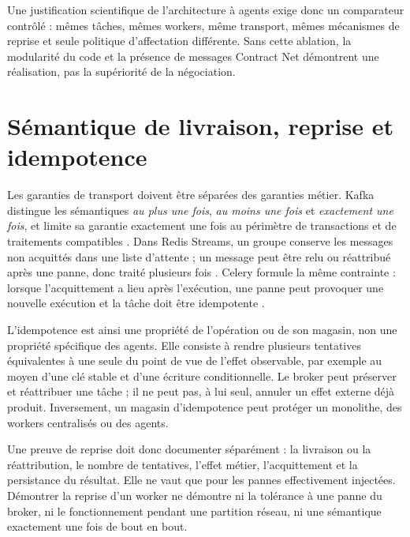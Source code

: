 Une justification scientifique de l'architecture à agents exige donc un comparateur
contrôlé : mêmes tâches, mêmes workers, même transport, mêmes mécanismes de reprise et
seule politique d'affectation différente. Sans cette ablation, la modularité du code et
la présence de messages Contract Net démontrent une réalisation, pas la supériorité de la
négociation.

\section{Sémantique de livraison, reprise et idempotence}

Les garanties de transport doivent être séparées des garanties métier. Kafka distingue
les sémantiques \textit{au plus une fois}, \textit{au moins une fois} et
\textit{exactement une fois}, et limite sa garantie exactement une fois au périmètre de
transactions et de traitements compatibles \cite{kafka2026semantics}. Dans Redis
Streams, un groupe conserve les messages non acquittés dans une liste d'attente ; un
message peut être relu ou réattribué après une panne, donc traité plusieurs fois
\cite{redis2026streams}. Celery formule la même contrainte : lorsque l'acquittement a lieu
après l'exécution, une panne peut provoquer une nouvelle exécution et la tâche doit être
idempotente \cite{celery2026tasks}.

L'idempotence est ainsi une propriété de l'opération ou de son magasin, non une propriété
spécifique des agents. Elle consiste à rendre plusieurs tentatives équivalentes à une
seule du point de vue de l'effet observable, par exemple au moyen d'une clé stable et
d'une écriture conditionnelle. Le broker peut préserver et réattribuer une tâche ; il ne
peut pas, à lui seul, annuler un effet externe déjà produit. Inversement, un magasin
d'idempotence peut protéger un monolithe, des workers centralisés ou des agents.

Une preuve de reprise doit donc documenter séparément : la livraison ou la réattribution,
le nombre de tentatives, l'effet métier, l'acquittement et la persistance du résultat.
Elle ne vaut que pour les pannes effectivement injectées. Démontrer la reprise d'un
worker ne démontre ni la tolérance à une panne du broker, ni le fonctionnement pendant
une partition réseau, ni une sémantique exactement une fois de bout en bout.

